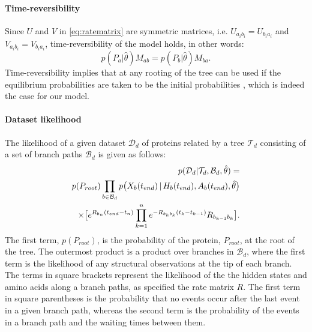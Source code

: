 \documentclass[nogrid]{MBE}%
\begin{document}
\paragraph{Time-reversibility}
Since $U$ and $V$ in \eqref{eq:ratematrix} are symmetric matrices, i.e. $U_{a_{i}b_{i}}=U_{b_{i}a_{i}}$ and $V_{a_{i}b_{i}}=V_{b_{i}a_{i}}$, time-reversibility of the model holds, in other words:
\begin{equation}
p(P_a|\hat{\theta})M_{ab} = p(P_b|\hat{\theta})M_{ba}.
\end{equation}
Time-reversibility implies that at any rooting of the tree can be used if the equilibrium probabilities are taken to be the initial probabilities \citep{felsenstein1981evolutionary}, which is indeed the case for our model.

\paragraph{Dataset likelihood}
The likelihood of a given dataset $\mathcal{D}_d$ of proteins related by a tree $\mathcal{T}_d$ consisting of a set of branch paths $\mathcal{B}_d$  is given as follows:
\begin{align}
p(\mathcal{D}_d|\mathcal{T}_d,\mathcal{B}_d,\hat{\theta})=\notag\\
p(P_{root})\prod_{b \in \mathcal{B}_d} p\big(X_{b}(t_{end})\,|\,H_{b}(t_{end}),A_{b}(t_{end}),\hat{\theta}\big)\notag\\ 
\times \big[e^{R_{b_{n}}(t_{end}-t_{n})} \prod_{k=1}^{n}  e^{-R_{b_{k}b_{k}}(t_{k}-t_{k-1})} R_{b_{k-1}b_{k}} \big].
\end{align}
The first term, $p(P_{root})$, is the probability of the protein, $P_{root}$, at the root of the tree. The outermost product is a product over branches in $\mathcal{B}_d$, where the first term is the likelihood of any structural observations at the tip of each branch. The terms in square brackets represent the likelihood of the the hidden states and amino acids along a branch paths, as specified the rate matrix $R$. The first term in square parentheses is the probability that no events occur after the last event in a given branch path, whereas the second term is the probability of the events in a branch path and the waiting times between them.
\end{document}
